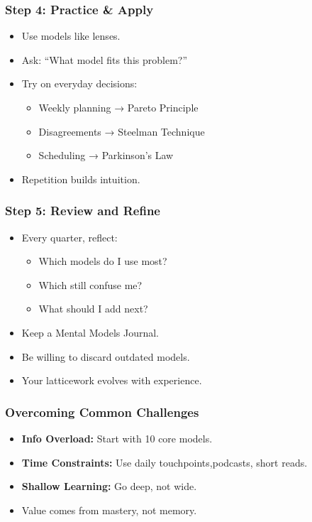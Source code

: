 \begin{frame}[fragile]\frametitle{Step 4: Practice \& Apply}
  \begin{itemize}
    \item Use models like lenses.
    \item Ask: ``What model fits this problem?''
    \item Try on everyday decisions:
      \begin{itemize}
        \item Weekly planning → Pareto Principle
        \item Disagreements → Steelman Technique
        \item Scheduling → Parkinson's Law
      \end{itemize}
    \item Repetition builds intuition.
  \end{itemize}
\end{frame}

\begin{frame}[fragile]\frametitle{Step 5: Review and Refine}
  \begin{itemize}
    \item Every quarter, reflect:
      \begin{itemize}
        \item Which models do I use most?
        \item Which still confuse me?
        \item What should I add next?
      \end{itemize}
    \item Keep a Mental Models Journal.
    \item Be willing to discard outdated models.
    \item Your latticework evolves with experience.
  \end{itemize}
\end{frame}

\begin{frame}[fragile]\frametitle{Overcoming Common Challenges}
  \begin{itemize}
    \item \textbf{Info Overload:} Start with 10 core models.
    \item \textbf{Time Constraints:} Use daily touchpoints,podcasts, short reads.
    \item \textbf{Shallow Learning:} Go deep, not wide.
    \item Value comes from mastery, not memory.
  \end{itemize}
\end{frame}


